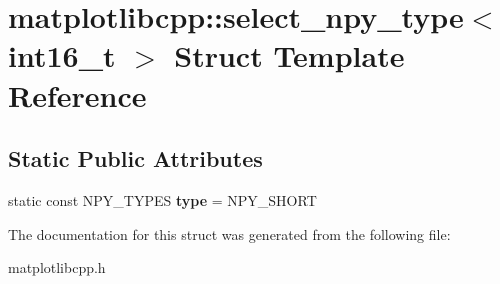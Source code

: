 \hypertarget{structmatplotlibcpp_1_1select__npy__type_3_01int16__t_01_4}{}\section{matplotlibcpp\+:\+:select\+\_\+npy\+\_\+type$<$ int16\+\_\+t $>$ Struct Template Reference}
\label{structmatplotlibcpp_1_1select__npy__type_3_01int16__t_01_4}
\subsection*{Static Public Attributes}
\begin{DoxyCompactItemize}
\item 
\mbox{\label{structmatplotlibcpp_1_1select__npy__type_3_01int16__t_01_4_aa7e1803c594ccc58c2cd4c8818d5a158}} 
static const N\+P\+Y\+\_\+\+T\+Y\+P\+ES {\bfseries type} = N\+P\+Y\+\_\+\+S\+H\+O\+RT
\end{DoxyCompactItemize}


The documentation for this struct was generated from the following file\+:\begin{DoxyCompactItemize}
\item 
matplotlibcpp.\+h\end{DoxyCompactItemize}
